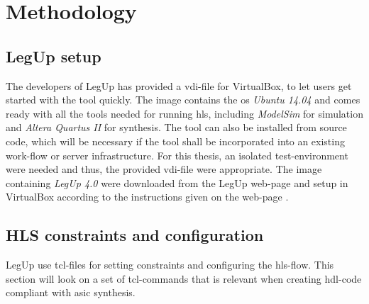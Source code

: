 \chapter{Methodology}
\label{chp:methodology} 

\section{LegUp setup}
The developers of LegUp has provided a \gls{vdi}-file for VirtualBox, to let users get started with the tool quickly. The image contains the \gls{os} \textit{Ubuntu 14.04} and comes ready with all the tools needed for running \gls{hls}, including \textit{ModelSim} for simulation and \textit{Altera Quartus II} for synthesis. The tool can also be installed from source code, which will be necessary if the tool shall be incorporated into an existing work-flow or server infrastructure.
For this thesis, an isolated test-environment were needed and thus, the provided \gls{vdi}-file were appropriate. The image containing \textit{LegUp 4.0} were downloaded from the LegUp web-page and setup in VirtualBox according to the instructions given on the web-page \cite{legupgetstarted}. 

\section{HLS constraints and configuration}
LegUp use \gls{tcl}-files for setting constraints and configuring the \gls{hls}-flow. This section will look on a set of \gls{tcl}-commands that is relevant when creating \gls{hdl}-code compliant with \gls{asic} synthesis.
